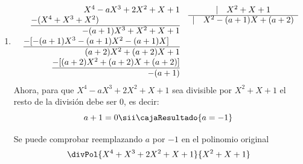 \begin{enumerate}[label=\roman*)]
  \item
        $$
          \begin{array}{r@{\quad}l}
            X^4 - aX^3 + 2X^2 + X + 1                                    & \multicolumn{1}{c}{| \quad X^2 + X + 1}          \\
            \cline{2-2}
            \underline{-(X^4 + X^3 + X^2)\phantom{-aX^3 + 2X^2 + X + 1}} & \multicolumn{1}{c}{| \quad X^2 - (a+1)X + (a+2)} \\
            -(a+1)X^3 + X^2 + X + 1                                      &                                                  \\
            \underline{-[-(a+1)X^3 - (a+1)X^2 - (a+1)X]\phantom{+1}}     &                                                  \\
            (a+2)X^2 + (a+2)X + 1                                        &                                                  \\
            \underline{-[(a+2)X^2 + (a+2)X + (a+2)]}                     &                                                  \\
            -(a+1)                                                       &
          \end{array}
        $$
        Ahora, para que $X^4 -aX^3 + 2X^2 + X + 1$ sea divisible por $X^2 + X + 1$ el resto de la división debe ser 0, es decir:
        $$
          a + 1 = 0
          \sii
          \cajaResultado{
            a = -1
          }
        $$

        Se puede comprobar reemplazando $a$ por $-1$ en el polinomio original
        $$
          \divPol{X^4 + X^3 + 2X^2 + X + 1}{X^2 + X + 1}
        $$


\end{enumerate}
